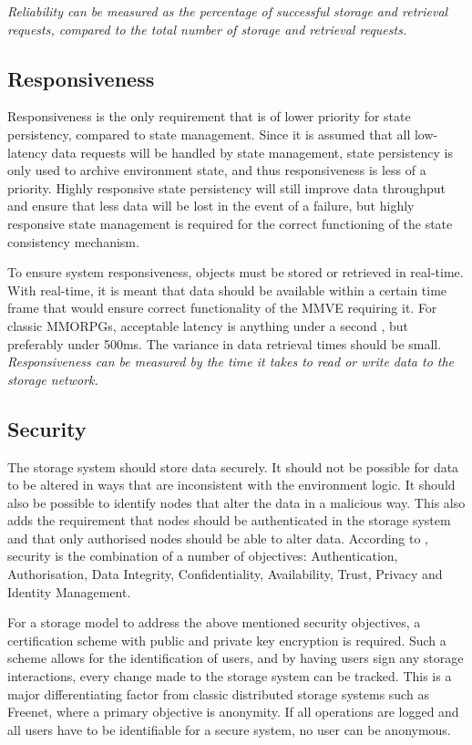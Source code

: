 \emph{Reliability can be measured as the percentage of successful storage and retrieval requests, compared to the total number of storage and retrieval requests.}

\subsection{Responsiveness}
\label{char_responsiveness}

Responsiveness is the only requirement that is of lower priority for state persistency, compared to state management. Since it is assumed that all low-latency data requests will be handled by state management, state persistency is only used to archive environment state, and thus responsiveness is less of a priority. Highly responsive state persistency will still improve data throughput and ensure that less data will be lost in the event of a failure, but highly responsive state management is required for the correct functioning of the state consistency mechanism.

To ensure system responsiveness, objects must be stored or retrieved in real-time. With real-time, it is meant that data should be available within a certain time frame that would ensure correct functionality of the MMVE requiring it. For classic MMORPGs, acceptable latency is anything under a second \cite{WoW_delay_effect}, but preferably under 500ms. The variance in data retrieval times should be small. \emph{Responsiveness can be measured by the time it takes to read or write data to the storage network.}

\subsection{Security}
\label{characteristics_security}

The storage system should store data securely. It should not be possible for data to be altered in ways that are inconsistent with the environment logic. It should also be possible to identify nodes that alter the data in a malicious way. This also adds the requirement that nodes should be authenticated in the storage system and that only authorised nodes should be able to alter data. According to \cite{distributed_systems_security}, security is the combination of a number of objectives: Authentication, Authorisation, Data Integrity, Confidentiality, Availability, Trust, Privacy and Identity Management.

For a storage model to address the above mentioned security objectives, a certification scheme with public and private key encryption is required. Such a scheme allows for the identification of users, and by having users sign any storage interactions, every change made to the storage system can be tracked. This is a major differentiating factor from classic distributed storage systems such as Freenet, where a primary objective is anonymity. If all operations are logged and all users have to be identifiable for a secure system, no user can be anonymous.

